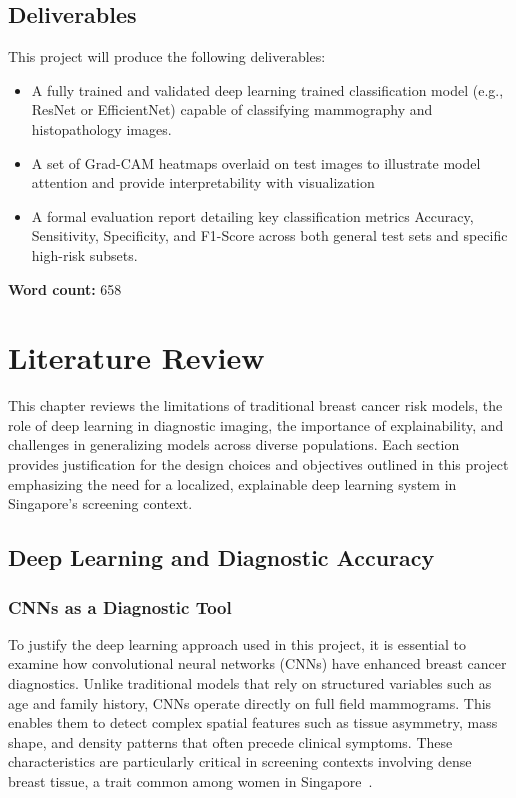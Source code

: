 \documentclass[12pt]{article}
\begin{document}
\subsection{Deliverables}
This project will produce the following deliverables:
\begin{itemize}
    \item A fully trained and validated deep learning trained classification model (e.g., ResNet or EfficientNet) capable of classifying mammography and histopathology images.
    \item A set of Grad-CAM heatmaps overlaid on test images to illustrate model attention and provide interpretability with visualization
    \item A formal evaluation report detailing key classification metrics Accuracy, Sensitivity, Specificity, and F1-Score across both general test sets and specific high-risk subsets.
\end{itemize}

\vspace{2em}
\noindent\textbf{Word count:} 658

\newpage

\newpage
\section{Literature Review}
\label{chapter2}

This chapter reviews the limitations of traditional breast cancer risk models, the role of deep learning in diagnostic imaging, the importance of explainability, and challenges in generalizing models across diverse populations. Each section provides justification for the design choices and objectives outlined in this project emphasizing the need for a localized, explainable deep learning system in Singapore's screening context.

\subsection{Deep Learning and Diagnostic Accuracy}

\subsubsection{CNNs as a Diagnostic Tool}

To justify the deep learning approach used in this project, it is essential to examine how convolutional neural networks (CNNs) have enhanced breast cancer diagnostics. Unlike traditional models that rely on structured variables such as age and family history, CNNs operate directly on full field mammograms. This enables them to detect complex spatial features such as tissue asymmetry, mass shape, and density patterns that often precede clinical symptoms. These characteristics are particularly critical in screening contexts involving dense breast tissue, a trait common among women in Singapore~\cite{6}.
\end{document}

